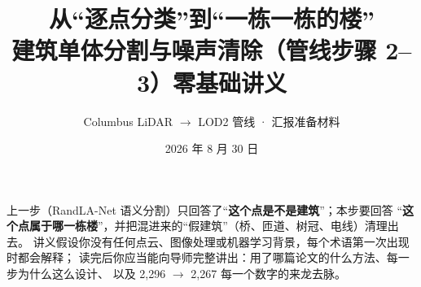 \documentclass[11pt]{ctexart}
\title{\textbf{从``逐点分类''到``一栋一栋的楼''}\\[0.3em]
\Large 建筑单体分割与噪声清除（管线步骤 2--3）零基础讲义}
\author{Columbus LiDAR $\to$ LOD2 管线 · 汇报准备材料}
\date{2026 年 8 月 30 日}
\begin{document}
\maketitle

\begin{plainbox}[：这本讲义讲什么]
上一步（RandLA-Net 语义分割）只回答了``\textbf{这个点是不是建筑}''；本步要回答
``\textbf{这个点属于哪一栋楼}''，并把混进来的``假建筑''（桥、匝道、树冠、电线）清理出去。
讲义假设你没有任何点云、图像处理或机器学习背景，每个术语第一次出现时都会解释；
读完后你应当能向导师完整讲出：用了哪篇论文的什么方法、每一步为什么这么设计、
以及 2{,}296 $\to$ 2{,}267 每一个数字的来龙去脉。
\end{plainbox}

\tableofcontents
\newpage


\newpage

\newpage

\newpage

\newpage

\newpage

\newpage

\end{document}
